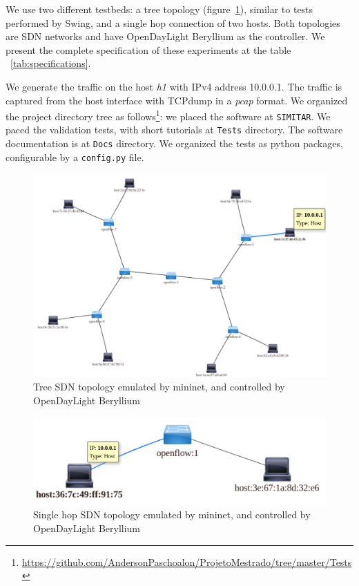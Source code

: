 We use two different testbeds: a tree topology (figure~\ref{fig:topo-tree}), similar to tests performed by Swing\cite{swing-paper}\cite{background-traffic-matter}\cite{legotg-paper}, and a single hop connection of two hosts. Both topologies are SDN networks and have OpenDayLight Beryllium as the controller.  We present the complete specification of these experiments at the table ~\ref{tab:specifications}.
	
We generate the traffic on the host \textit{h1} with IPv4 address 10.0.0.1. The traffic is captured from the host interface with TCPdump in a \textit{pcap} format.  We organized the project directory tree as follows\footnote{ \href{https://github.com/AndersonPaschoalon/ProjetoMestrado/tree/master/Tests}{https://github.com/AndersonPaschoalon/ProjetoMestrado/tree/master/Tests} }: we placed the software at \texttt{SIMITAR}. We paced the validation tests, with short tutorials at \texttt{Tests} directory. The software documentation is at \texttt{Docs} directory. We organized the tests as python packages, configurable by a \texttt{config.py} file.


\begin{figure}[!ht]
	\centering
	\includegraphics[scale=0.4]{figures/ch5/topo-tree}
	\caption{Tree SDN topology emulated by mininet, and controlled by OpenDayLight Beryllium}
	\label{fig:topo-tree}
\end{figure}

\begin{figure}[!ht]
	\centering
	\includegraphics[scale=0.4]{figures/ch5/topo-simple}
	\caption{Single hop SDN topology emulated by mininet, and controlled by OpenDayLight Beryllium}
	\label{fig:topo-simple}
\end{figure}


